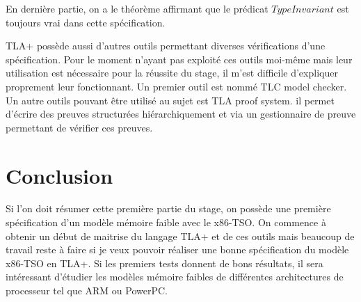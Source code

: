 \documentclass[12pt,a4paper]{article}
\begin{document}
En dernière partie, on a le théorème affirmant que le prédicat $TypeInvariant$ est toujours vrai dans cette spécification.

TLA+ possède aussi d'autres outils permettant diverses vérifications d'une spécification. Pour le moment n'ayant pas exploité ces outils moi-même mais leur utilisation est nécessaire pour la réussite du stage, il m'est difficile d'expliquer proprement leur fonctionnant. Un premier outil est nommé TLC model checker. Un autre outils pouvant être utilisé au sujet est TLA proof system. il permet d'écrire des preuves structurées hiérarchiquement et via un gestionnaire de preuve permettant de vérifier ces preuves.  

\section{Conclusion}

Si l'on doit résumer cette première partie du stage, on possède une première spécification d'un modèle mémoire faible avec le x86-TSO. On commence à obtenir un début de maitrise du langage TLA+ et de ces outils mais beaucoup de travail reste à faire si je veux pouvoir réaliser une bonne spécification du modèle x86-TSO en TLA+. Si les premiers tests donnent de bons résultats, il sera intéressant d'étudier les modèles mémoire faibles de différentes architectures de processeur tel que ARM\cite{Alglave:2009:SPA:1481839.1481842} ou PowerPC.

\clearpage



\end{document}
